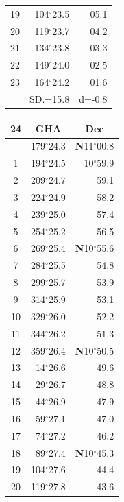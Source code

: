 \documentclass[10pt, a4paper]{report}
\begin{document}
\begin{scriptsize}
\begin{tabular*}{0.2\textwidth}[t]{@{\extracolsep{\fill}}|c|rr|}
19 & 104$^\circ$23.5 & 05.1\\
20 & 119$^\circ$23.7 & 04.2\\
21 & 134$^\circ$23.8 & \raisebox{0.24ex}{\boldmath$\cdot$~\boldmath$\cdot$~~}03.3\\
22 & 149$^\circ$24.0 & 02.5\\
23 & 164$^\circ$24.2 & 01.6\\
\hline
\rule{0pt}{2.4ex} & \multicolumn{1}{c}{SD.=15.8} & \multicolumn{1}{c|}{d=-0.8}\\
\hline
\end{tabular*}\noindent
\begin{tabular*}{0.2\textwidth}[t]{@{\extracolsep{\fill}}|c|rr|}
\hline
\multicolumn{1}{|c|}{\rule{0pt}{2.6ex}\textbf{24}} & \multicolumn{1}{c}{\textbf{GHA}} & \multicolumn{1}{c|}{\textbf{Dec}}\\
\hline\rule{0pt}{2.6ex}\noindent
0 & 179$^\circ$24.3 & \textbf{N}11$^\circ$00.8\\
1 & 194$^\circ$24.5 & 10$^\circ$59.9\\
2 & 209$^\circ$24.7 & 59.1\\
3 & 224$^\circ$24.9 & \raisebox{0.24ex}{\boldmath$\cdot$~\boldmath$\cdot$~~}58.2\\
4 & 239$^\circ$25.0 & 57.4\\
5 & 254$^\circ$25.2 & 56.5\\[2Pt]
6 & 269$^\circ$25.4 & \textbf{N}10$^\circ$55.6\\
7 & 284$^\circ$25.5 & 54.8\\
8 & 299$^\circ$25.7 & 53.9\\
9 & 314$^\circ$25.9 & \raisebox{0.24ex}{\boldmath$\cdot$~\boldmath$\cdot$~~}53.1\\
10 & 329$^\circ$26.0 & 52.2\\
11 & 344$^\circ$26.2 & 51.3\\[2Pt]
12 & 359$^\circ$26.4 & \textbf{N}10$^\circ$50.5\\
13 & 14$^\circ$26.6 & 49.6\\
14 & 29$^\circ$26.7 & 48.8\\
15 & 44$^\circ$26.9 & \raisebox{0.24ex}{\boldmath$\cdot$~\boldmath$\cdot$~~}47.9\\
16 & 59$^\circ$27.1 & 47.0\\
17 & 74$^\circ$27.2 & 46.2\\[2Pt]
18 & 89$^\circ$27.4 & \textbf{N}10$^\circ$45.3\\
19 & 104$^\circ$27.6 & 44.4\\
20 & 119$^\circ$27.8 & 43.6\\

\end{tabular*}
\end{scriptsize}
\end{document}
